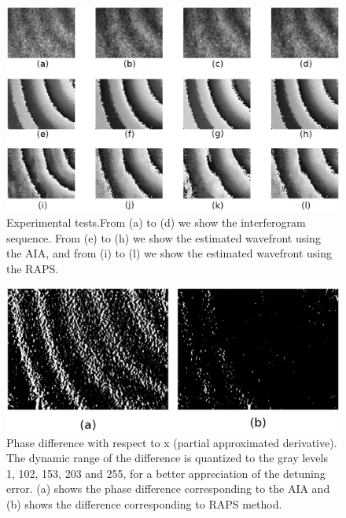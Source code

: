 \begin{figure}[th!]
	\begin{center}
		\includegraphics[scale=0.3]{Chpt3_figures/fig_3.eps}
	\end{center}
	\caption{Experimental tests.From (a) to (d) we show the interferogram
	sequence. From (e) to (h) we show the estimated wavefront using the AIA,
	and from (i) to (l) we show the estimated wavefront using the RAPS.} 
	\label{fig:ExperimentalTestRAPS}
\end{figure}

\begin{figure}[th!]
	\begin{center}
		\includegraphics[scale=0.3]{Chpt3_figures/fig_4.eps}
	\end{center}
	\caption{Phase difference with respect to x (partial approximated
	derivative). The dynamic range of the difference is quantized to the
	gray levels 1, 102, 153, 203 and 255, for a better appreciation of the
	detuning error. (a) shows the phase difference corresponding to the AIA
	and (b) shows the difference corresponding to RAPS method.}
	\label{fig:DynamicRAPS}
\end{figure}


